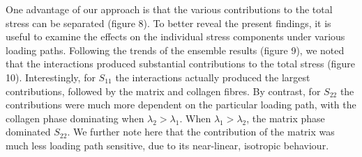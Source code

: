     One advantage of our approach is that the various contributions to the total stress can be separated (figure 8). To better reveal the present findings, it is useful to examine the effects on the individual stress components under various loading paths. Following the trends of the ensemble results (figure 9), we noted that the interactions produced substantial contributions to the total stress (figure 10). Interestingly, for $S_{11}$ the interactions actually produced the largest contributions, followed by the matrix and collagen fibres. By contrast, for $S_{22}$ the contributions were much more dependent on the particular loading path, with the collagen phase dominating when $\lambda_2>\lambda_1$. When $\lambda_1>\lambda_2$, the matrix phase dominated $S_22$. We further note here that the contribution of the matrix was much less loading path sensitive, due to its near-linear, isotropic behaviour.